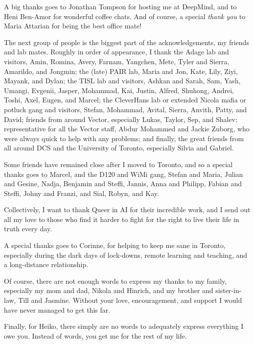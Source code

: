 A big thanks goes to Jonathan Tompson for hosting me at DeepMind, and to Heni Ben-Amor for wonderful coffee chats.
And of course, a special \emph{thank you} to Maria Attarian for being the best office mate!

The next group of people is the biggest part of the acknowledgements, my friends and lab mates.
Roughly in order of appearance, I thank
the Adage lab and visitors, Amin, Romina, Avery, Farnam, Yangchen, Mete, Tyler and Sierra, Amarildo, and Jongmin; 
the (late) PAIR lab, Maria and Jon, Kate, Lily, Ziyi, Mayank, and Dylan; 
the TISL lab and visitors, Ashkan and Sarah, Sam, Yash, Umangi, Evgenii, Jasper, Mohammad, Kai, Justin, Alfred, Shuhong, Andrei, Toshi, Axel, Eugen, and Marcel;
the CleverHans lab or extended Nicola mafia or potluck gang and visitors, Stefan, Mohammad, Avital, Sierra, Anvith, Patty, and David; 
friends from around Vector, especially Lukas, Taylor, Sep, and Shalev; 
representative for all the Vector staff, Abdur Mohammed and Jackie Zuborg, who were always quick to help with any problems; 
and finally, the great friends from all around DCS and the University of Toronto, especially Silvia and Gabriel.

Some friends have remained close after I moved to Toronto, and so a special thanks goes to Marcel, and the D120 and WiMi gang, Stefan and Maria, Julian and Gesine, Nadja, Benjamin and Steffi, Jannis, Anna and Philipp, Fabian and Steffi, Johny and Franzi, and Sial, Robyn, and Kay.

Collectively, I want to thank Queer in AI for their incredible work, and I send out all my love to those who find it harder to fight for the right to live their life in truth every day.

A special thanks goes to Corinne, for helping to keep me sane in Toronto, especially during the dark days of lock-downs, remote learning and teaching, and a long-distance relationship.

Of course, there are not enough words to express my thanks to my family, especially my mom and dad, Nikola and Hinrich, and my brother and sister-in-law, Till and Jasmine.
Without your love, encouragement, and support I would have never managed to get this far.

Finally, for Heiko, there simply are no words to adequately express everything I owe you.
Instead of words, you get me for the rest of my life.
